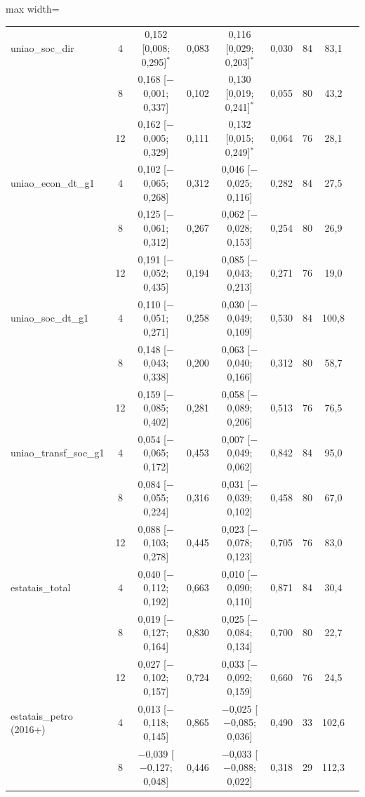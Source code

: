 \begin{table}[htbp]
\begin{adjustbox}{max width=\linewidth}
\begin{tabular}{lcccccccc}
uniao\_soc\_dir & 4 & 0{,}152 [0{,}008; 0{,}295]$^{*}$ & 0{,}083 & 0{,}116 [0{,}029; 0{,}203]$^{*}$ & 0{,}030 & 84 & 83{,}1 \\
 & 8 & 0{,}168 [$-$0{,}001; 0{,}337] & 0{,}102 & 0{,}130 [0{,}019; 0{,}241]$^{*}$ & 0{,}055 & 80 & 43{,}2 \\
 & 12 & 0{,}162 [$-$0{,}005; 0{,}329] & 0{,}111 & 0{,}132 [0{,}015; 0{,}249]$^{*}$ & 0{,}064 & 76 & 28{,}1 \\
uniao\_econ\_dt\_g1 & 4 & 0{,}102 [$-$0{,}065; 0{,}268] & 0{,}312 & 0{,}046 [$-$0{,}025; 0{,}116] & 0{,}282 & 84 & 27{,}5 \\
 & 8 & 0{,}125 [$-$0{,}061; 0{,}312] & 0{,}267 & 0{,}062 [$-$0{,}028; 0{,}153] & 0{,}254 & 80 & 26{,}9 \\
 & 12 & 0{,}191 [$-$0{,}052; 0{,}435] & 0{,}194 & 0{,}085 [$-$0{,}043; 0{,}213] & 0{,}271 & 76 & 19{,}0 \\
uniao\_soc\_dt\_g1 & 4 & 0{,}110 [$-$0{,}051; 0{,}271] & 0{,}258 & 0{,}030 [$-$0{,}049; 0{,}109] & 0{,}530 & 84 & 100{,}8 \\
 & 8 & 0{,}148 [$-$0{,}043; 0{,}338] & 0{,}200 & 0{,}063 [$-$0{,}040; 0{,}166] & 0{,}312 & 80 & 58{,}7 \\
 & 12 & 0{,}159 [$-$0{,}085; 0{,}402] & 0{,}281 & 0{,}058 [$-$0{,}089; 0{,}206] & 0{,}513 & 76 & 76{,}5 \\
uniao\_transf\_soc\_g1 & 4 & 0{,}054 [$-$0{,}065; 0{,}172] & 0{,}453 & 0{,}007 [$-$0{,}049; 0{,}062] & 0{,}842 & 84 & 95{,}0 \\
 & 8 & 0{,}084 [$-$0{,}055; 0{,}224] & 0{,}316 & 0{,}031 [$-$0{,}039; 0{,}102] & 0{,}458 & 80 & 67{,}0 \\
 & 12 & 0{,}088 [$-$0{,}103; 0{,}278] & 0{,}445 & 0{,}023 [$-$0{,}078; 0{,}123] & 0{,}705 & 76 & 83{,}0 \\
estatais\_total & 4 & 0{,}040 [$-$0{,}112; 0{,}192] & 0{,}663 & 0{,}010 [$-$0{,}090; 0{,}110] & 0{,}871 & 84 & 30{,}4 \\
 & 8 & 0{,}019 [$-$0{,}127; 0{,}164] & 0{,}830 & 0{,}025 [$-$0{,}084; 0{,}134] & 0{,}700 & 80 & 22{,}7 \\
 & 12 & 0{,}027 [$-$0{,}102; 0{,}157] & 0{,}724 & 0{,}033 [$-$0{,}092; 0{,}159] & 0{,}660 & 76 & 24{,}5 \\
estatais\_petro (2016+) & 4 & 0{,}013 [$-$0{,}118; 0{,}145] & 0{,}865 & $-$0{,}025 [$-$0{,}085; 0{,}036] & 0{,}490 & 33 & 102{,}6 \\
 & 8 & $-$0{,}039 [$-$0{,}127; 0{,}048] & 0{,}446 & $-$0{,}033 [$-$0{,}088; 0{,}022] & 0{,}318 & 29 & 112{,}3 \\

\end{tabular}
\end{adjustbox}
\end{table}
